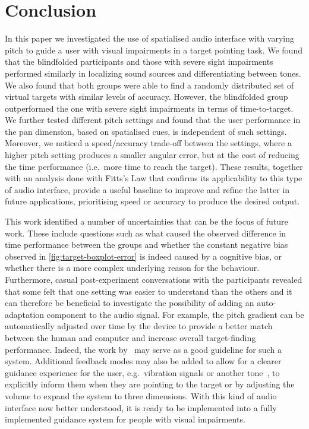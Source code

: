 \documentclass[acmsmall]{acmart}
\begin{document}
\section{Conclusion}\label{sec:conclusion}

In this paper we investigated the use of spatialised audio interface with varying pitch to guide a user with visual impairments in a target pointing task.
We found that the blindfolded participants and those with severe sight impairments performed similarly in localizing sound sources and differentiating between tones. 
We also found that both groups were able to find a randomly distributed set of virtual targets with similar levels of accuracy.
However, the blindfolded group outperformed the one with severe sight impairments in terms of time-to-target. 
We further tested different pitch settings and found that the user performance in the pan dimension, based on spatialised cues, is independent of such settings.
Moreover, we noticed a speed/accuracy trade-off between the settings, where a higher pitch setting produces a smaller angular error, but at the cost of reducing the time performance (i.e.\ more time to reach the target). 
These results, together with an analysis done with Fitts's Law that confirms its applicability to this type of audio interface, provide a useful baseline to improve and refine the latter in future applications, prioritising speed or accuracy to produce the desired output.

This work identified a number of uncertainties that can be the focus of future work.
These include questions such as what caused the observed difference in time performance between the groups and whether the constant negative bias observed in \cref{fig:target-boxplot-error} is indeed caused by a cognitive bias, or whether there is a more complex underlying reason for the behaviour.
Furthermore, casual post-experiment conversations with the participants revealed that some felt that one setting was easier to understand than the others and it can therefore be beneficial to investigate the possibility of adding an auto-adaptation component to the audio signal.
For example, the pitch gradient can be automatically adjusted over time by the device to provide a better match between the human and computer and increase overall target-finding performance.
Indeed, the work by~\citet{gallina2015progressive} may serve as a good guideline for such a system.
Additional feedback modes may also be added to allow for a clearer guidance experience for the user, e.g.\ vibration signals or another tone~\citep{marentakis2006effects}, to explicitly inform them when they are pointing to the target or by adjusting the volume to expand the system to three dimensions.
With this kind of audio interface now better understood, it is ready to be implemented into a fully implemented guidance system for people with visual impairments.



\end{document}
